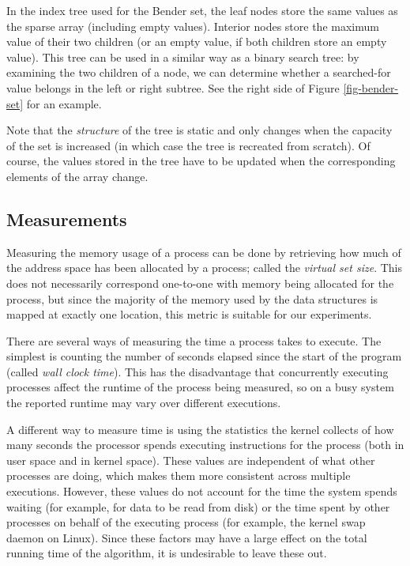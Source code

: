 \documentclass{acm_proc_article-sp}
\begin{document}
In the index tree used for the Bender set, the leaf nodes store the same values
as the sparse array (including empty values).
Interior nodes store the maximum value of their two children (or an empty value,
if both children store an empty value).
This tree can be used in a similar way as a binary search tree: by examining the
two children of a node, we can determine whether a searched-for value belongs
in the left or right subtree.
See the right side of Figure \ref{fig-bender-set} for an example.

Note that the \emph{structure} of the tree is static and only changes when the
capacity of the set is increased (in which case the tree is recreated from scratch).
Of course, the values stored in the tree have to be updated when the corresponding
elements of the array change.

\subsection{Measurements}
Measuring the memory usage of a process can be done by retrieving how much of the
address space has been allocated by a process; called the \emph{virtual set
size}. This does not necessarily correspond one-to-one with memory being allocated
for the process, but since the majority of the memory used by the
data structures is mapped at exactly one location, this metric is suitable
for our experiments.

There are several ways of measuring the time a process takes to execute.
The simplest is counting the number of seconds elapsed since the start of the
program (called \emph{wall clock time}).
This has the disadvantage that concurrently executing processes affect the runtime
of the process being measured, so on a busy system the reported runtime may vary
over different executions.

A different way to measure time is using the statistics the kernel collects
of how many seconds the processor spends executing instructions for the process
(both in user space and in kernel space). These values are independent of
what other processes are doing, which makes them more consistent across
multiple executions. However, these values do not account for the time the
system spends waiting (for example, for data to be read from disk)
or the time spent by other processes on behalf of the executing process
(for example, the kernel swap daemon on Linux). Since these factors may have
a large effect on the total running time of the algorithm, it is undesirable
to leave these out.
\end{document}

